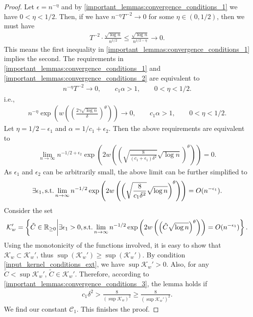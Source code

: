 \begin{proof}
    Let $\epsilon = n^{-\eta}$ and by \eqref{important_lemmas:convergence_conditions_1} we have $0< \eta < 1/2$. Then, if we have $ n^{-\eta} T^{-2} \to 0$ for some $\eta \in (0,1/2)$, then we must have
    \begin{align}
        T^{-2} \cdot \frac{\sqrt{\log n}}{n^{1/2}} \leq \frac{\sqrt{\log n}}{n^{1/2 -\eta}} \to 0.
    \end{align}
    This means the first inequality in \eqref{important_lemmas:convergence_conditions_1} implies the second. The requirements in \eqref{important_lemmas:convergence_conditions_1} and \eqref{important_lemmas:convergence_conditions_2} are equivalent to
    \begin{align}
        n^{-\eta} T^{-2} \to 0,\qquad  c_1 \alpha > 1, \qquad 0< \eta < 1/2.
    \end{align}
    i.e.,
    \begin{align}
        n^{-\eta} \exp \left(w\left(\left(\frac{2\gamma \sqrt{\log n}}{\delta} \right)^{\theta} \right) \right) \to 0,\qquad  c_1 \alpha > 1, \qquad 0< \eta < 1/2.
    \end{align}
    Let  $\eta = 1/2 - \epsilon_1$ and $\alpha = 1/c_1 + \epsilon_2$. Then the above requirements are equivalent to
    \begin{align}
        \lim_{n \to \infty} n^{-1/2+\epsilon_2} \exp \left(2 w\left(\left(\sqrt{\frac{8}{(c_1+\epsilon_1)\delta^2}}\sqrt{\log n} \right)^{\theta} \right) \right) = 0.
    \end{align}
    As $\epsilon_1$ and $\epsilon_2$ can be arbitrarily small, the above limit can be further simplified to
    \begin{align} \label{important_lemmas:convergence_conditions_3}
        \exists \epsilon_1, \text{\normalfont s.t.}\lim_{n \to \infty} n^{-1/2} \exp \left(2w\left(\left(\sqrt{\frac{8}{c_1\delta^2}}\sqrt{\log n} \right)^{\theta} \right) \right) = O(n^{-\epsilon_1}).
    \end{align}
    Consider the set
    \begin{align} \label{tsne:kw_prime}
        \mathcal{K}_w' = \left\{\tilde{C} \in \mathbb{R}_{\geq 0} \bigg\rvert \exists \epsilon_1>0, \text{\normalfont s.t.} \lim_{n \to \infty} n^{-1/2} \exp \left(2 w\left(\left(\tilde{C} \sqrt{\log n} \right)^{\theta} \right) \right) = O(n^{-\epsilon_1}) \right\}.
    \end{align}
    Using the monotonicity of the functions involved, it is easy to show that $\mathcal{K}_w \subset \mathcal{K}_w'$, thus $\sup(\mathcal{K}_w') \geq \sup(\mathcal{K}_w')$. By condition \ref{input_kernel_conditions_ext}, we have $\sup \mathcal{K}_w' >0$. Also, for any $\tilde{C} < \sup \mathcal{K}_w'$, $\tilde{C} \in \mathcal{K}_w'$. Therefore, according to \eqref{important_lemmas:convergence_conditions_3}, the lemma holds if
    \begin{align}
        c_1\delta^2 > \frac{8}{(\sup \mathcal{K}_w)^2} \geq \frac{8}{(\sup \mathcal{K}_w')^2}.
    \end{align}
    We find our constant $\mathcal{C}_1$. This finishes the proof.
\end{proof}
